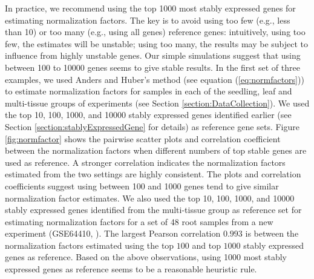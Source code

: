 \documentclass[letterpaper,12pt]{article}
\begin{document}
			In practice, we recommend using the top 1000 most stably expressed genes for
			estimating normalization factors. The key is to avoid using too few (e.g.,
			less than 10) or too many (e.g., using all genes) reference genes:
			intuitively, using too few, the estimates will be unstable; using too many,
			the results may be subject to influence from highly unstable genes.
			Our simple simulations suggest that using between 100 to 10000 genes seems to
			give stable results. In the first set of three examples, we used Anders and
			Huber's method (see equation (\ref{eq:normfactors})) to estimate normalization
			factors for samples in each of the seedling, leaf and multi-tissue groups of
			experiments (see Section \ref{section:DataCollection}).  We used the top 10,
			100, 1000, and 10000 stably expressed genes identified earlier (see Section
			\ref{section:stablyExpressedGene} for details) as reference gene sets. Figure
			\ref{fig:normfactor} shows the pairwise scatter plots and correlation
			coefficient between the normalization factors when different numbers of top
			stable genes are used as reference. A stronger correlation indicates the
			normalization factors estimated from the two settings are highly consistent.
			The plots and correlation coefficients suggest using between 100 and 1000
			genes tend to give similar normalization factor estimates. We also used the
			top 10, 100, 1000, and 10000 stably expressed genes identified from the
			multi-tissue group as reference set for estimating normalization factors for a set
			of 48 root samples from a new experiment (GSE64410, \cite{vragovic2015translatome}). 
			The largest Pearson correlation
			$0.993$ is between the normalization factors estimated using the top $100$
			and top $1000$ stably expressed genes as reference. Based on the above
			observations, using 1000 most stably expressed genes as reference seems to be
			a reasonable heuristic rule.
			
			
			
			
\end{document}
